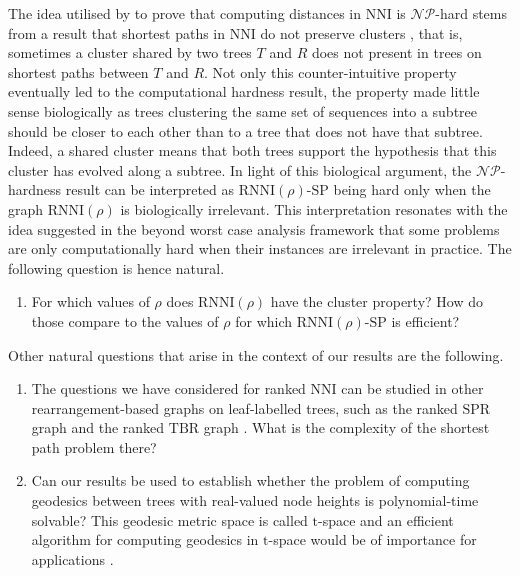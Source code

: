 \documentclass[11pt]{amsart}
\newcommand{\rnni}{\mathrm{RNNI}}
\newcommand{\nni}{\mathrm{NNI}}
\newcommand{\spr}{\mathrm{SPR}}
\newcommand{\tbr}{\mathrm{TBR}}
\newcommand{\np}{\mathcal{NP}}
\newcommand{\decprob}[1]{\rnni(#1)\text{-}\mathrm{SP}}
\begin{document}
The idea utilised by \textcite{Dasgupta2000-xa} to prove that computing distances in $\nni$ is $\np$-hard stems from a result that shortest paths in $\nni$ do not preserve clusters \autocite{Li1996-zw}, that is, sometimes a cluster shared by two trees $T$ and $R$ does not present in trees on shortest paths between $T$ and $R$.
Not only this counter-intuitive property eventually led to the computational hardness result, the property made little sense biologically as trees clustering the same set of sequences into a subtree should be closer to each other than to a tree that does not have that subtree.
Indeed, a shared cluster means that both trees support the hypothesis that this cluster has evolved along a subtree.
In light of this biological argument, the $\np$-hardness result can be interpreted as $\decprob{\rho}$ being hard only when the graph $\rnni(\rho)$ is biologically irrelevant.
This interpretation resonates with the idea suggested in the beyond worst case analysis framework \autocite{Roughgarden2019-to} that some problems are only computationally hard when their instances are irrelevant in practice.
The following question is hence natural.
\begin{enumerate}
\item For which values of $\rho$ does $\rnni(\rho)$ have the cluster property?
How do those compare to the values of $\rho$ for which $\decprob{\rho}$ is efficient?
\end{enumerate}
Other natural questions that arise in the context of our results are the following.
\begin{enumerate}
\addtocounter{enumi}{1}
\item The questions we have considered for ranked $\nni$ can be studied in other rearrangement-based graphs on leaf-labelled trees, such as the ranked $\spr$ graph and the ranked $\tbr$ graph \autocite{Semple2003-nj}.
What is the complexity of the shortest path problem there?

\item Can our results be used to establish whether the problem of computing geodesics between trees with real-valued node heights is polynomial-time solvable?
This geodesic metric space is called $\mathrm t$-space and an efficient algorithm for computing geodesics in $\mathrm t$-space would be of importance for applications \autocite{Gavryushkin2016-uu}.
\end{enumerate}


\printbibliography
\end{document}
